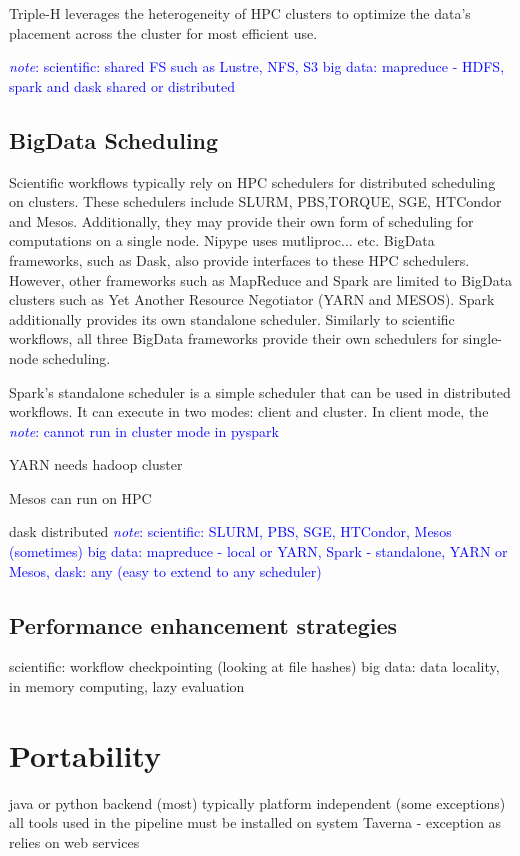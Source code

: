 \documentclass{report}
\newcommand{\note}[1]{\textcolor{blue}{\textit{note}: #1}}
\begin{document}
                Triple-H leverages the heterogeneity of HPC clusters to 
                optimize the data's placement across the cluster for most 
                efficient use.
            
            \note{scientific: shared FS such as Lustre, NFS, S3
            big data: mapreduce - HDFS, spark and dask shared or distributed}
        \section{BigData Scheduling}\label{sched}

            
            Scientific workflows typically rely on HPC schedulers for 
            distributed scheduling on clusters. These schedulers include SLURM,
            PBS,TORQUE, SGE, HTCondor and Mesos. Additionally, they may provide
            their own form of scheduling for computations on a single node. 
            Nipype uses mutliproc... etc. BigData frameworks, such as Dask,
            also provide interfaces to these HPC schedulers. However, other
            frameworks such as MapReduce and Spark are limited to BigData 
            clusters such as Yet Another Resource Negotiator (YARN and MESOS).
            Spark additionally provides its own standalone scheduler. Similarly
            to scientific workflows, all three BigData frameworks provide their
            own schedulers for single-node scheduling.

            Spark's standalone scheduler is a simple scheduler that can be used
            in distributed workflows. It can execute in two modes: client and
            cluster. In client mode, the  \note{cannot run in cluster mode in pyspark} 

            YARN needs hadoop cluster

            Mesos can run on HPC

            dask distributed
            \note{scientific: SLURM, PBS, SGE, HTCondor, Mesos (sometimes)
            big data: mapreduce - local or YARN, Spark - standalone, YARN or 
            Mesos, dask: any (easy to extend to any scheduler)}
        \section{Performance enhancement strategies}\label{other}
            scientific: workflow checkpointing (looking at file hashes)
            big data: data locality, in memory computing, lazy evaluation
    \chapter{Portability}\label{portability}
        java or python backend (most) typically platform independent (some 
        exceptions)
        all tools used in the pipeline must be installed on system
        Taverna - exception as relies on web services
\end{document}
